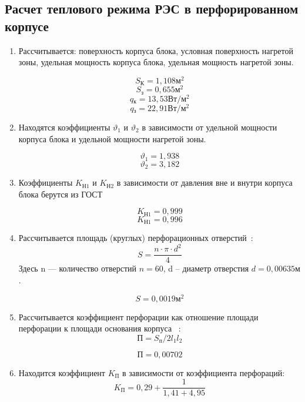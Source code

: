 \subsection{Расчет теплового режима РЭС в перфорированном корпусе}

\begin{enumerate}[label={\arabic*.}]

\item Рассчитывается:
  поверхность корпуса блока,
  условная поверхность нагретой зоны,
  удельная мощность корпуса блока,
  удельная мощность нагретой зоны.

  $$S\mathrm{_{К}}=1,108\mathrm{м^2}$$
  $$S\mathrm{_{з}} = 0,655 \mathrm{м^2}$$
  $$q\mathrm{_к} = 13,53\mathrm{Вт/м^2}$$
  $$q\mathrm{_з} = 22,91 \mathrm{ Вт/м^2}$$

\item Находятся коэффициенты $\vartheta_1$ и
  $\vartheta_2$ в зависимости от
  удельной мощности корпуса блока и
  удельной мощности нагретой зоны.

  $$\vartheta_1=1,938$$
  $$\vartheta_2=3,182$$


\item Коэффициенты $K\mathrm{_{Н1}}$ и $K\mathrm{_{Н2}}$
  в зависимости от давления вне и
  внутри корпуса блока берутся из ГОСТ

  $$K\mathrm{_{Н1}} = 0,999$$
  $$K\mathrm{_{Н1}} = 0,996$$

\item Рассчитывается площадь (круглых)
  перфорационных отверстий~\cite{Rotkop1976}:
  \begin{equation}
    S = \frac{n \cdot \pi \cdot d^2}{4}
    \end{equation}
    Здесь n — количество отверстий $n = 60$,
    d – диаметр отверстия $d = 0,00635\mathrm{м}$.

    $$S = 0,0019\mathrm{м^2}$$

\item Рассчитывается коэффициент перфорации
    как отношение площади перфорации к
    площади основания корпуса ~\cite{Rotkop1976}:
    \begin{equation}
    \mathrm{П} = S\mathrm{_п}/2 l_1 l_2
  \end{equation}

  $$\mathrm{П} = 0,00702$$

\item Находится коэффициент $K\mathrm{_П}$ в зависимости от
  коэффициента перфораций:
  \begin{equation}
    K\mathrm{_П} = 0,29 + \frac{1}{1,41 + 4,95}
  \end{equation}
 

\end{enumerate}

